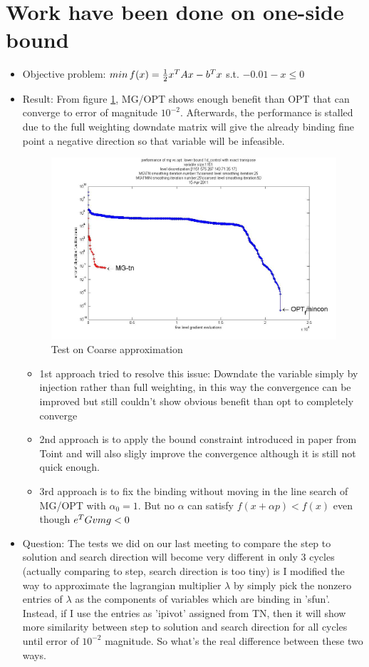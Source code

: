 \documentclass[10pt]{article}
\begin{document}
\section{Work have been done on one-side bound }
\begin{itemize}
\item Objective problem: $min\, f(x)=\frac{1}{2}  x^T Ax-b^T x$ s.t. $-0.01-x\leq 0$
\item Result: From figure \ref{fig:1s1151}, MG/OPT shows enough benefit than OPT that can converge to error of magnitude $10^{-2}$. Afterwards, the performance is stalled due to the full weighting downdate matrix will give the already binding fine point a negative direction so that variable will be infeasible. 
\begin{figure}[h]
\centering
  \includegraphics[width=1.0\textwidth]{plot_exact_tr_1sb1151.jpg}
  \caption{Test on Coarse approximation}
\label{fig:1s1151}
\end{figure}
\begin{itemize}
\item 1st approach tried to resolve this issue: Downdate the variable simply by injection rather than full weighting, in this way the convergence can be improved but still couldn't show obvious benefit than opt to completely converge
\item 2nd approach is to apply the bound constraint introduced in paper from Toint and will also sligly improve the convergence although it is still not quick enough.
\item 3rd approach is to fix the binding without moving in the line search of MG/OPT with $\alpha_{0}=1$. But no $\alpha$ can satisfy $f(x+\alpha p)< f(x)$ even though $e^T Gvmg <0$
\end{itemize}
\item Question: The tests we did on our last meeting to compare the step to solution and search direction will become very different in only 3 cycles (actually comparing to step, search direction is too tiny) is  I modified the way to approximate the lagrangian multiplier $\lambda$ by simply pick the nonzero entries of $\lambda$ as the components of variables which are binding in 'sfun'. Instead, if I use the entries as 'ipivot' assigned from TN, then it will show more similarity between step to solution and search direction for all cycles until error of $10^{-2}$ magnitude. So what's the real difference between these two ways.
\end{itemize}    
\end{document}
